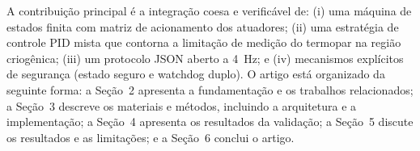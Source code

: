 A contribui\c{c}\~ao principal \'e a integra\c{c}\~ao coesa e verific\'avel de:
(i) uma m\'aquina de estados finita com matriz de acionamento dos atuadores;
(ii) uma estrat\'egia de controle PID mista que contorna a limita\c{c}\~ao de
medi\c{c}\~ao do termopar na regi\~ao criog\^enica; (iii) um protocolo JSON
aberto a 4~Hz; e (iv) mecanismos expl\'icitos de seguran\c{c}a (estado seguro e
watchdog duplo). O artigo est\'a organizado da seguinte forma: a Se\c{c}\~ao~2
apresenta a fundamenta\c{c}\~ao e os trabalhos relacionados; a Se\c{c}\~ao~3
descreve os materiais e m\'etodos, incluindo a arquitetura e a implementa\c{c}\~ao;
a Se\c{c}\~ao~4 apresenta os resultados da valida\c{c}\~ao; a Se\c{c}\~ao~5
discute os resultados e as limita\c{c}\~oes; e a Se\c{c}\~ao~6 conclui o artigo.
